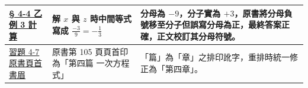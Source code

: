\documentclass[a4paper,12pt,twoside]{article}
\begin{document}
\begin{table}[H]
\begin{tabularx}{\textwidth}{|p{3.2cm}|p{3.8cm}|X|}
\hyperref[ex:4-4-5]{§ 4-4 乙 例 3 計算} & 
解 $x$ 與 $z$ 時中間等式寫成 $\frac{-3}{9} = -\frac{1}{3}$ & 
分母為 $-9$，分子實為 $+3$，原書將分母負號移至分子但誤寫分母為正，最終答案正確，正文校訂其分母符號。 \\ \hline

\hyperref[sec:ex4-7]{習題 4-7 原書頁首書眉} & 
原書第 105 頁頁首印為「第四篇 一次方程式」 & 
「篇」為「章」之排印訛字，重排時統一修正為「第四章」。 \\ \hline

\end{tabularx}
\end{table}

\clearpage
\tableofcontents
\newpage


\end{document}
